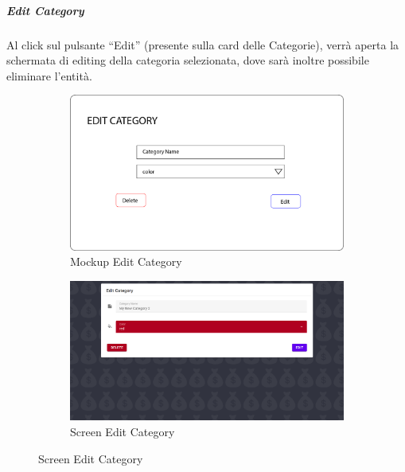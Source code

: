 \documentclass{report}
\begin{document}
\subparagraph{Edit Category}
Al click sul pulsante “Edit” (presente sulla card delle Categorie), verrà aperta la schermata di editing della categoria selezionata, dove sarà inoltre possibile eliminare l’entità.
\begin{figure}[H]
    \begin{subfigure}
        \centering
        \includegraphics[scale=0.3]{images/mockups/Edit Category.png}
        \caption{Mockup Edit Category}
    \end{subfigure}
    \par\bigskip
    \begin{subfigure}
        \centering
        \includegraphics[scale=0.35]{images/screens/Edit Category.png}
        \caption{Screen Edit Category}
    \end{subfigure}
\end{figure}
\end{document}
